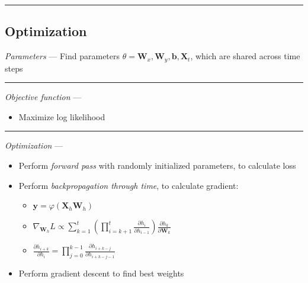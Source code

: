 {\color{black}\hrule height 0.001mm}

\subsection*{Optimization}
\emph{Parameters} --- Find parameters $\theta = \boldsymbol{W}_x, \boldsymbol{W}_y, \boldsymbol{b}, \boldsymbol{X}_t$, which are shared across time steps

{\color{lightgray}\hrule height 0.001mm}

\emph{Objective function} --- 
\begin{itemize}
    \item Maximize log likelihood
\end{itemize}

{\color{lightgray}\hrule height 0.001mm}

\emph{Optimization} ---
\begin{itemize}
    \item Perform \emph{forward pass} with randomly initialized parameters, to calculate loss
    \item Perform \emph{backpropagation through time}, to calculate gradient:
    \begin{itemize}
        \item $\boldsymbol{y} = \varphi( \boldsymbol{X}_h \boldsymbol{W}_h )$
        \item $\nabla_{\boldsymbol{W}_h} L \propto \sum_{k=1}^t ( \prod_{i=k+1}^t \frac{\partial h_i}{\partial h_{i-1}} ) \frac{\partial h_k}{\partial \boldsymbol{W}_k}$
        \item $\frac{\partial h_{i+k}}{\partial h_{i}} = \prod_{j=0}^{k-1} \frac{\partial h_{i+k-j}}{\partial h_{i+k-j-1}}$
    \end{itemize}
    \item Perform gradient descent to find best weights 
\end{itemize}